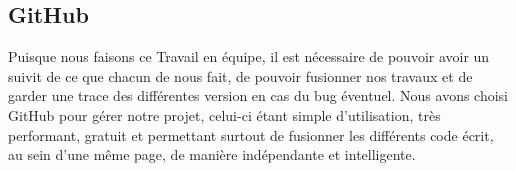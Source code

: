 \subsection{GitHub}
Puisque nous faisons ce Travail en équipe, il est nécessaire de pouvoir avoir un suivit de ce que chacun de nous fait, de pouvoir fusionner nos travaux et de garder une trace des différentes version en cas du bug éventuel. Nous avons choisi GitHub pour gérer notre projet, celui-ci étant simple d'utilisation, très performant, gratuit et permettant surtout de fusionner les différents code écrit, au sein d'une même page, de manière indépendante et intelligente.

